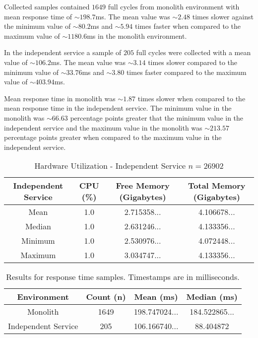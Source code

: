 Collected samples contained $1649$ full cycles from monolith environment with mean response time of $\sim198.7$ms.
The mean value was $\sim2.48$ times slower against the minimum value of $\sim 80.2$ms and $\sim5.94$ times faster when compared to the maximum value of $\sim1180.6$ms in the monolith environment.

In the independent service a sample of $205$ full cycles were collected with a mean value of $\sim106.2$ms.
The mean value was $\sim3.14$ times slower compared to the minimum value of $\sim 33.76$ms and $\sim3.80$ times faster compared to the maximum value of $\sim 403.94$ms.

Mean response time in monolith was $\sim1.87$ times slower when compared to the mean response time in the independent service.
The minimum value in the monolith was $\sim 66.63$ percentage points greater that the minimum value in the independent service and the maximum value in the monolith was $\sim 213.57$ percentage points greater when compared to the maximum value in the independent service.

\begin{table}[ht!]
       \begin{tabular}{|c|c|c|c|} 
        \hline
        Independent Service
        & CPU (\%)
        & Free Memory (Gigabytes)
        & Total Memory (Gigabytes) \\ [0.5ex] 
        
        \hline\hline
        Mean
        & 1.0
        & 2.715358... 
        & 4.106678...
        \\
        
        Median
        & 1.0
        & 2.631246...
        & 4.133356...
        \\ 

        Minimum
        & 1.0
        & 2.530976...
        & 4.072448...
        \\ 
        
        Maximum
        & 1.0
        & 3.034747...
        & 4.133356...
        \\
        \hline
    \end{tabular}
    \caption{Hardware Utilization - Independent Service $n=26902$}
    \label{table:hardware results:independent service:1}
\end{table}

\begin{table}[ht!]
    \begin{tabular}{|c|c|c|c|} 
        \hline
        Environment
        & Count (n)
        & Mean (ms)
        & Median (ms)
        \\ [0.5ex] 
        
        \hline\hline
        Monolith
        & 1649
        & 198.747024...
        & 184.522865...
        \\ 
        
        Independent Service
        & 205
        & 106.166740...
        & 88.404872
        \\
        \hline
    \end{tabular}
    \caption{Results for response time samples. Timestamps are in milliseconds.}
    \label{table:response time results:1}
\end{table}


